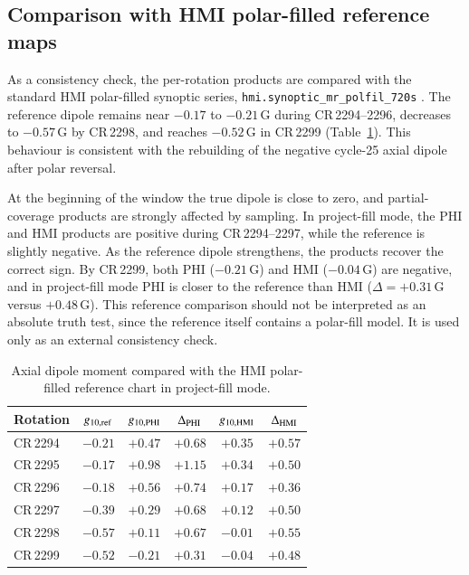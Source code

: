 \documentclass{aa}
\begin{document}
\subsection{Comparison with HMI polar-filled reference maps}
\label{sec:results-reference}

As a consistency check, the per-rotation products are compared with the standard HMI polar-filled synoptic series, \texttt{hmi.synoptic\_mr\_polfil\_720s} \citep{Sun2018}. The reference dipole remains near $-0.17$ to $-0.21$\,G during CR\,2294--2296, decreases to $-0.57$\,G by CR\,2298, and reaches $-0.52$\,G in CR\,2299 (Table~\ref{tab:reference}). This behaviour is consistent with the rebuilding of the negative cycle-25 axial dipole after polar reversal.

At the beginning of the window the true dipole is close to zero, and partial-coverage products are strongly affected by sampling. In project-fill mode, the PHI and HMI products are positive during CR\,2294--2297, while the reference is slightly negative. As the reference dipole strengthens, the products recover the correct sign. By CR\,2299, both PHI ($-0.21$\,G) and HMI ($-0.04$\,G) are negative, and in project-fill mode PHI is closer to the reference than HMI ($\Delta=+0.31$\,G versus $+0.48$\,G). This reference comparison should not be interpreted as an absolute truth test, since the reference itself contains a polar-fill model. It is used only as an external consistency check.

\begin{table}
\caption{Axial dipole moment compared with the HMI polar-filled reference chart in project-fill mode.}
\label{tab:reference}
\centering
\footnotesize
\begin{tabular}{lccccc}
\hline\hline
Rotation & $g_{10,{\rm ref}}$ & $g_{10,{\rm PHI}}$ & $\Delta_{\rm PHI}$ & $g_{10,{\rm HMI}}$ & $\Delta_{\rm HMI}$ \\
\hline
CR\,2294 & $-0.21$ & $+0.47$ & $+0.68$ & $+0.35$ & $+0.57$ \\
CR\,2295 & $-0.17$ & $+0.98$ & $+1.15$ & $+0.34$ & $+0.50$ \\
CR\,2296 & $-0.18$ & $+0.56$ & $+0.74$ & $+0.17$ & $+0.36$ \\
CR\,2297 & $-0.39$ & $+0.29$ & $+0.68$ & $+0.12$ & $+0.50$ \\
CR\,2298 & $-0.57$ & $+0.11$ & $+0.67$ & $-0.01$ & $+0.55$ \\
CR\,2299 & $-0.52$ & $-0.21$ & $+0.31$ & $-0.04$ & $+0.48$ \\
\hline
\end{tabular}
\end{table}
\end{document}
